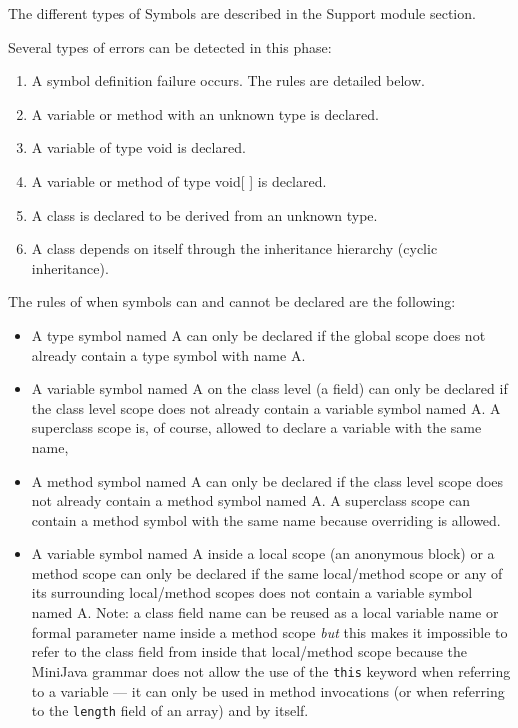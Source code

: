 \documentclass[a4paper,11pt]{article}
\begin{document}
The different types of Symbols are described in the Support module section.

Several types of errors can be detected in this phase:
\begin{enumerate}
    \item A symbol definition failure occurs. The rules are detailed below.
    \item A variable or method with an unknown type is declared.
    \item A variable of type void is declared.
    \item A variable or method of type void[ ] is declared.
    \item A class is declared to be derived from an unknown type.
    \item A class depends on itself through the inheritance hierarchy (cyclic inheritance).
\end{enumerate}

The rules of when symbols can and cannot be declared are the following:
\begin{itemize}
    \item A type symbol named A can only be declared if the global scope does not already contain a type symbol with name A.
    \item A variable symbol named A on the class level (a field) can only be declared if the class level scope does not already contain a variable symbol named A. A superclass scope is, of course, allowed to declare a variable with the same name, 
    \item A method symbol named A can only be declared if the class level scope does not already contain a method symbol named A. A superclass scope can contain a method symbol with the same name because overriding is allowed.
    \item A variable symbol named A inside a local scope (an anonymous block) or a method scope can only be declared if the same local/method scope or any of its surrounding local/method scopes does not contain a variable symbol named A. Note: a class field name can be reused as a local variable name or formal parameter name inside a method scope \emph{but} this makes it impossible to refer to the class field from inside that local/method scope because the MiniJava grammar does not allow the use of the \verb,this, keyword when referring to a variable --- it can only be used in method invocations (or when referring to the \verb,length, field of an array) and by itself.
\end{itemize}
\end{document}
